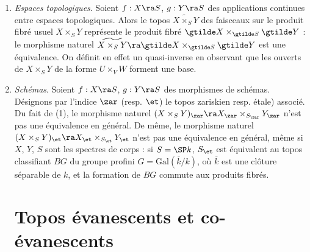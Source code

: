 \documentclass[10pt]{../fichiers-configuration-latex/smfart}
\begin{document}
\begin{exemples}\label{11-exemples produits fibrés}
\renewcommand{\theenumi}{(\arabic{enumi})}
\begin{enumerate}
\item \textit{Espaces topologiques}. Soient $f : X \ra S$, $g : Y \ra S$ des applications continues
entre espaces topologiques. Alors le topos $\widetilde{X \times_S Y} $ des faisceaux sur le produit
fibré usuel $X \times_S Y$ représente le produit fibré $\gtilde X \times_{\gtilde S} \gtilde Y$ : le
morphisme naturel $\widetilde{X \times_S Y} \ra \gtilde X \times_{\gtilde S} \gtilde Y$ est une
équivalence. On définit en effet un quasi-inverse en observant que les ouverts de $X \times_S Y$ de
la forme $U \times_V W$ forment une base. 

\item \textit{Schémas}. Soient $f : X \ra S$, $g : Y \ra S$ des morphismes de schémas. Désignons par
l'indice $\zar$ (resp. $\et$) le topos zariskien resp. étale) associé. Du fait de (1),
le morphisme naturel $(X \times_S Y)_{\zar} \ra X_{\zar} \times_{S_{\zar}} Y_{\zar}$ n'est pas une
équivalence en général. De même, le morphisme naturel $(X \times_S Y)_{\et} \ra
X_{\et} \times_{S_{\et}} Y_{\et}$ n'est pas une équivalence en général, même
si $X$, $Y$, $S$ sont les spectres de corps : si $S = \SP k$, $S_{\et}$ est équivalent au
topos classifiant $BG$ du groupe profini $G = \mathrm{Gal}(\overline{k}/k)$, où $\overline{k}$ est
une clôture séparable de $k$, et la formation de $BG$ commute aux produits fibrés.  \section{Topos
évanescents et co-évanescents}
\end{enumerate}
\end{exemples}
\end{document}
